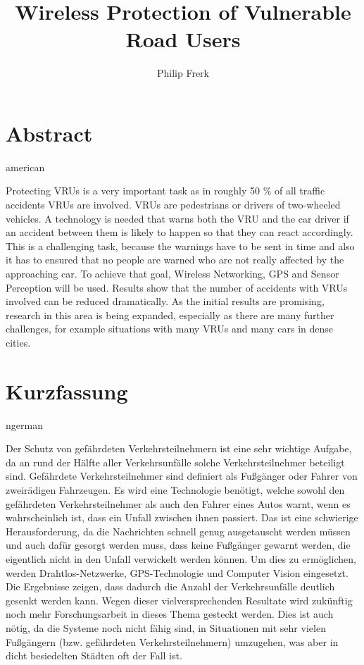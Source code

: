 \documentclass[]{ccs-thesis}
\author{Philip Frerk}
\title{Wireless Protection of Vulnerable Road Users}
\begin{document}

\maketitle


\chapter*{Abstract}
\begin{otherlanguage*}{american}

Protecting \acp{VRU} is a very important task as in roughly 50 \% of all traffic accidents \acp{VRU} are involved. \acp{VRU} are pedestrians or drivers of two-wheeled vehicles.
A technology is needed that warns both the \ac{VRU} and the car driver if an accident between them is likely to happen so that they can react accordingly.  This is a challenging task, because the warnings have to be sent in time  and also it has to ensured that no people are warned who are not really affected by the approaching car.
To achieve that goal, Wireless Networking, GPS and Sensor Perception will be used.
Results show that the number of accidents with \acp{VRU} involved can be reduced dramatically.
As the initial results are promising, research in this area is being expanded, especially as there are many further challenges, for example situations with many \acp{VRU} and many cars in dense cities.


\end{otherlanguage*}


\chapter*{Kurzfassung}
\begin{otherlanguage*}{ngerman}

Der Schutz von gefährdeten Verkehrsteilnehmern ist eine sehr wichtige Aufgabe, da an rund der Hälfte aller Verkehrsunfälle solche Verkehrsteilnehmer beteiligt sind. Gefährdete Verkehrsteilnehmer sind definiert als Fußgänger oder Fahrer von zweirädigen Fahrzeugen. Es wird eine Technologie benötigt, welche sowohl den gefährdeten Verkehrsteilnehmer als auch den Fahrer eines Autos warnt, wenn es wahrscheinlich ist, dass ein Unfall zwischen ihnen passiert. Das ist eine schwierige Herausforderung, da die Nachrichten schnell genug ausgetauscht werden müssen und auch dafür gesorgt werden muss, dass keine Fußgänger gewarnt werden, die eigentlich nicht in den Unfall verwickelt werden können. Um dies zu ermöglichen, werden Drahtlos-Netzwerke, GPS-Technologie und Computer Vision eingesetzt. Die Ergebnisse zeigen, dass dadurch die Anzahl der Verkehrsunfälle deutlich gesenkt werden kann. Wegen dieser vielversprechenden Resultate wird zukünftig noch mehr Forschungsarbeit in dieses Thema gesteckt werden. Dies ist auch nötig, da die Systeme noch nicht fähig sind, in Situationen mit sehr vielen Fußgängern (bzw. gefährdeten Verkehrsteilnehmern) umzugehen, was aber in dicht besiedelten Städten oft der Fall ist.


\end{otherlanguage*}
\acresetall
\end{document}
